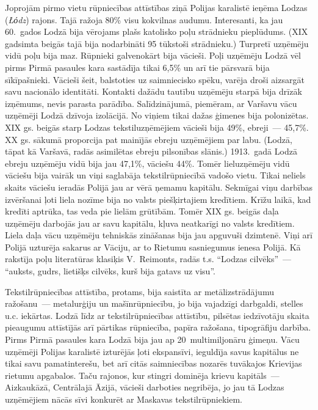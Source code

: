 \documentclass[twoside,a5paper,12pt,fleqn,openany]{extbook}
\newcommand{\pltxti}[1]{\textit{\textpolish{#1}}}
\begin{document}
Joprojām pirmo vietu rūpniecības attīstības ziņā Polijas karalistē ieņēma Lodzas (\pltxti{Łόdz}) rajons. Tajā ražoja 80\% visu kokvilnas audumu. Interesanti, ka jau 60.~gados Lodzā bija vērojams plašs katolisko poļu strādnieku pieplūdums. (XIX gadsimta beigās tajā bija nodarbināti 95 tūkstoši strādnieku.) Turpretī uzņēmēju vidū poļu bija maz. Rūpnieki galvenokārt bija vācieši. Poļi uzņēmēju Lodzā vēl pirms Pirmā pasaules kara sastādīja tikai 6,5\% un arī tie pārsvarā bija sīkīpašnieki. Vācieši šeit, balstoties uz saimniecisko spēku, varēja droši aizsargāt savu nacionālo identitāti. Kontakti dažādu tautību uzņēmēju starpā bija drīzāk izņēmums, nevis parasta parādība. Salīdzinājumā, piemēram, ar Varšavu vācu uzņēmēji Lodzā dzīvoja izolācijā. No viņiem tikai dažas ģimenes bija polonizētas. XIX gs. beigās starp Lodzas tekstiluzņēmējiem vācieši bija 49\%, ebreji~--- 45,7\%. XX gs. sākumā proporcija pat mainījās ebreju uzņēmējiem par labu. (Lodzā, tāpat kā Varšavā, radās asimilētas ebreju pilsonības slānis.) 1913.~gadā Lodzā ebreju uzņēmēju vidū bija jau 47,1\%, vāciešu 44\%. Tomēr lieluzņēmēju vidū vāciešu bija vairāk un viņi saglabāja tekstilrūpniecībā vadošo vietu. Tikai neliels skaits vāciešu ieradās Polijā jau ar vērā ņemamu kapitālu. Sekmīgai viņu darbības izvēršanai ļoti liela nozīme bija no valsts piešķirtajiem kredītiem. Krīžu laikā, kad kredīti aptrūka, tas veda pie lielām grūtībām. Tomēr XIX gs. beigās daļa uzņēmēju darbojās jau ar savu kapitālu, kļuva neatkarīgi no valsts kredītiem. Liela daļa vācu uzņēmēju tehniskās zināšanas bija jau apguvuši dzimtenē. Viņi arī Polijā uzturēja sakarus ar Vāciju, ar to Rietumu sasniegumus ienesa Polijā. Kā rakstīja poļu literatūras klasiķis V.~Reimonts, radās t.s. ``Lodzas cilvēks''~--- ``auksts, gudrs, lietišķs cilvēks, kurš bija gatavs uz visu''.

Tekstilrūpniecības attīstība, protams, bija saistīta ar metālizstrādājumu ražošanu~--- metalurģiju un mašīnrūpniecību, jo bija vajadzīgi darbgaldi, stelles u.c. iekārtas. Lodzā līdz ar tekstilrūpniecības attīstību, pilsētas iedzīvotāju skaita pieaugumu attīstījās arī pārtikas rūpniecība, papīra ražošana, tipogrāfiju darbība. Pirms Pirmā pasaules kara Lodzā bija jau ap 20~multimiljonāru ģimeņu. Vācu uzņēmēji Polijas karalistē izturējās ļoti ekspansīvi, ieguldīja savus kapitālus ne tikai savu pamatinterešu, bet arī citās saimniecības nozarēs tuvākajos Krievijas rietumu apgabalos. Taču rajonos, kur stingri dominēja krievu kapitāls~--- Aizkaukāzā, Centrālajā Āzijā, vācieši darboties negribēja, jo jau tā Lodzas uzņēmējiem nācās sīvi konkurēt ar Maskavas tekstilrūpniekiem.
\end{document}
